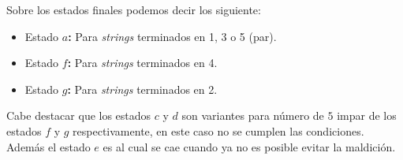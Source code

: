 \documentclass[spanish, fleqn]{article}
\begin{document}
\begin{enumerate}
				Sobre los estados finales podemos decir los siguiente:
				\begin{itemize}
					\item
						Estado \textbf{\(a\):} Para \emph{strings} terminados 
						en 1, 3 o 5 (par).
					\item
						Estado \textbf{\(f\):} Para \emph{strings} terminados
						en 4.
					\item
						Estado \textbf{\(g\):} Para \emph{strings} terminados
						en 2.
				\end{itemize}
				Cabe destacar que los estados \(c\) y \(d\) son variantes para 
				número de \(5\) impar de los estados \(f\) y \(g\) 
				respectivamente, en este caso no se cumplen las condiciones.\\
				Además el estado \(e\) es al cual se cae cuando ya no es 
				posible evitar la maldición.\\


\end{enumerate}
\end{document}
